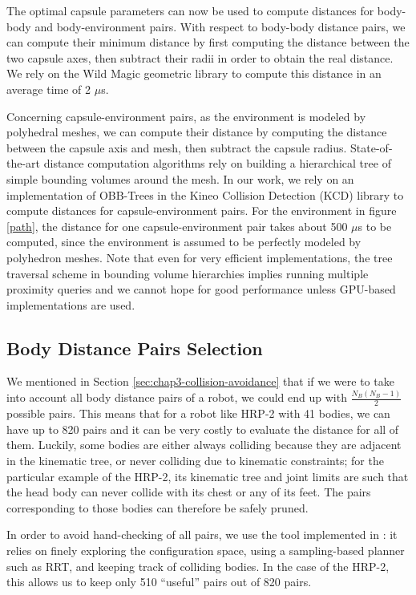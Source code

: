 The optimal capsule parameters can now be used to compute distances
for body-body and body-environment pairs. With respect to body-body
distance pairs, we can compute their minimum distance by first
computing the distance between the two capsule axes, then subtract
their radii in order to obtain the real distance. We rely on the Wild
Magic geometric library \cite{schneider2003geometric, wildmagic} to
compute this distance in an average time of 2 $\mu$s.

Concerning capsule-environment pairs, as the environment is modeled by
polyhedral meshes, we can compute their distance by computing the
distance between the capsule axis and mesh, then subtract the capsule
radius. State-of-the-art distance computation algorithms rely on
building a hierarchical tree of simple bounding volumes around the
mesh. In our work, we rely on an implementation of OBB-Trees in the
Kineo Collision Detection (KCD) library to compute distances for
capsule-environment pairs. For the environment in figure \ref{path},
the distance for one capsule-environment pair takes about 500 $\mu$s
to be computed, since the environment is assumed to be perfectly
modeled by polyhedron meshes. Note that even for very efficient
implementations, the tree traversal scheme in bounding volume
hierarchies implies running multiple proximity queries and we cannot
hope for good performance unless GPU-based implementations are used.

\subsection{Body Distance Pairs Selection}

We mentioned in Section \ref{sec:chap3-collision-avoidance} that if we
were to take into account all body distance pairs of a robot, we could
end up with $\frac{N_B(N_B - 1)}{2}$ possible pairs. This means that
for a robot like HRP-2 with 41 bodies, we can have up to 820 pairs and
it can be very costly to evaluate the distance for all of
them. Luckily, some bodies are either always colliding because they
are adjacent in the kinematic tree, or never colliding due to
kinematic constraints; for the particular example of the HRP-2, its
kinematic tree and joint limits are such that the head body can never
collide with its chest or any of its feet. The pairs corresponding to
those bodies can therefore be safely pruned.

In order to avoid hand-checking of all pairs, we use the tool
implemented in \cite{planning-environment}: it relies on finely
exploring the configuration space, using a sampling-based planner such
as RRT, and keeping track of colliding bodies. In the case of the
HRP-2, this allows us to keep only 510 ``useful'' pairs out of 820
pairs.

